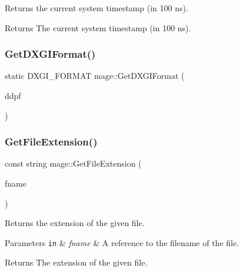 Returns the current system timestamp (in 100 ns).

\begin{DoxyReturn}{Returns}
The current system timestamp (in 100 ns). 
\end{DoxyReturn}
\hypertarget{namespacemage_a4fecf9823aec7c5ba078acf6bd73f983}{}\label{namespacemage_a4fecf9823aec7c5ba078acf6bd73f983} 
\subsubsection{\texorpdfstring{Get\+D\+X\+G\+I\+Format()}{GetDXGIFormat()}}
{\footnotesize\ttfamily static D\+X\+G\+I\+\_\+\+F\+O\+R\+M\+AT mage\+::\+Get\+D\+X\+G\+I\+Format (\begin{DoxyParamCaption}\item[{const \hyperlink{structmage_1_1_d_d_s___p_i_x_e_l_f_o_r_m_a_t}{D\+D\+S\+\_\+\+P\+I\+X\+E\+L\+F\+O\+R\+M\+AT} \&}]{ddpf }\end{DoxyParamCaption})\hspace{0.3cm}{\ttfamily [static]}}

\hypertarget{namespacemage_a4da638506a9dda4f16c41a1a00c0d0e1}{}\label{namespacemage_a4da638506a9dda4f16c41a1a00c0d0e1} 
\subsubsection{\texorpdfstring{Get\+File\+Extension()}{GetFileExtension()}\hspace{0.1cm}{\footnotesize\ttfamily [1/2]}}
{\footnotesize\ttfamily const string mage\+::\+Get\+File\+Extension (\begin{DoxyParamCaption}\item[{const string \&}]{fname }\end{DoxyParamCaption})}

Returns the extension of the given file.


\begin{DoxyParams}[1]{Parameters}
\mbox{\tt in}  & {\em fname} & A reference to the filename of the file. \\
\hline
\end{DoxyParams}
\begin{DoxyReturn}{Returns}
The extension of the given file. 
\end{DoxyReturn}

